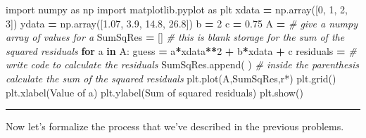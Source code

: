 \documentclass[
]{book}
\newenvironment{Shaded}{\begin{snugshade}}{\end{snugshade}}
\newcommand{\CommentTok}[1]{\textcolor[rgb]{0.56,0.35,0.01}{\textit{#1}}}
\newcommand{\ControlFlowTok}[1]{\textcolor[rgb]{0.13,0.29,0.53}{\textbf{#1}}}
\newcommand{\DecValTok}[1]{\textcolor[rgb]{0.00,0.00,0.81}{#1}}
\newcommand{\FloatTok}[1]{\textcolor[rgb]{0.00,0.00,0.81}{#1}}
\newcommand{\ImportTok}[1]{#1}
\newcommand{\KeywordTok}[1]{\textcolor[rgb]{0.13,0.29,0.53}{\textbf{#1}}}
\newcommand{\NormalTok}[1]{#1}
\newcommand{\OperatorTok}[1]{\textcolor[rgb]{0.81,0.36,0.00}{\textbf{#1}}}
\newcommand{\StringTok}[1]{\textcolor[rgb]{0.31,0.60,0.02}{#1}}
\theoremstyle{definition}
\theoremstyle{definition}
\theoremstyle{definition}
\theoremstyle{remark}
\begin{document}
\begin{Shaded}
\begin{Highlighting}[]
\ImportTok{import}\NormalTok{ numpy }\ImportTok{as}\NormalTok{ np}
\ImportTok{import}\NormalTok{ matplotlib.pyplot }\ImportTok{as}\NormalTok{ plt}
\NormalTok{xdata }\OperatorTok{=}\NormalTok{ np.array([}\DecValTok{0}\NormalTok{, }\DecValTok{1}\NormalTok{, }\DecValTok{2}\NormalTok{, }\DecValTok{3}\NormalTok{])}
\NormalTok{ydata }\OperatorTok{=}\NormalTok{ np.array([}\FloatTok{1.07}\NormalTok{, }\FloatTok{3.9}\NormalTok{, }\FloatTok{14.8}\NormalTok{, }\FloatTok{26.8}\NormalTok{])}
\NormalTok{b }\OperatorTok{=} \DecValTok{2}
\NormalTok{c }\OperatorTok{=} \FloatTok{0.75}
\NormalTok{A }\OperatorTok{=} \CommentTok{\# give a numpy array of values for a}
\NormalTok{SumSqRes }\OperatorTok{=}\NormalTok{ [] }\CommentTok{\# this is blank storage for the sum of the squared residuals}
\ControlFlowTok{for}\NormalTok{ a }\KeywordTok{in}\NormalTok{ A:}
\NormalTok{  guess }\OperatorTok{=}\NormalTok{ a}\OperatorTok{*}\NormalTok{xdata}\OperatorTok{**}\DecValTok{2} \OperatorTok{+}\NormalTok{ b}\OperatorTok{*}\NormalTok{xdata }\OperatorTok{+}\NormalTok{ c}
\NormalTok{  residuals }\OperatorTok{=} \CommentTok{\# write code to calculate the residuals}
\NormalTok{  SumSqRes.append(  ) }\CommentTok{\# inside the parenthesis calculate the sum of the squared residuals}
\NormalTok{plt.plot(A,SumSqRes,}\StringTok{\textquotesingle{}r*\textquotesingle{}}\NormalTok{)}
\NormalTok{plt.grid()}
\NormalTok{plt.xlabel(}\StringTok{\textquotesingle{}Value of a\textquotesingle{}}\NormalTok{)}
\NormalTok{plt.ylabel(}\StringTok{\textquotesingle{}Sum of squared residuals\textquotesingle{}}\NormalTok{)}
\NormalTok{plt.show()}
\end{Highlighting}
\end{Shaded}

\begin{center}\rule{0.5\linewidth}{0.5pt}\end{center}

Now let's formalize the process that we've described in the previous problems.
\end{document}
